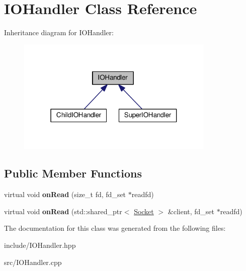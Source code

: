 \hypertarget{classIOHandler}{}\section{I\+O\+Handler Class Reference}
\label{classIOHandler}


Inheritance diagram for I\+O\+Handler\+:\nopagebreak
\begin{figure}[H]
\begin{center}
\leavevmode
\includegraphics[width=268pt]{classIOHandler__inherit__graph}
\end{center}
\end{figure}
\subsection*{Public Member Functions}
\begin{DoxyCompactItemize}
\item 
virtual void {\bfseries on\+Read} (size\+\_\+t fd, fd\+\_\+set $\ast$readfd)\hypertarget{classIOHandler_a623e46574ae279609c2f1f3020890c92}{}\label{classIOHandler_a623e46574ae279609c2f1f3020890c92}

\item 
virtual void {\bfseries on\+Read} (std\+::shared\+\_\+ptr$<$ \hyperlink{classSocket}{Socket} $>$ \&client, fd\+\_\+set $\ast$readfd)\hypertarget{classIOHandler_ac3d156d3c2051e6cc19256ad20111d52}{}\label{classIOHandler_ac3d156d3c2051e6cc19256ad20111d52}

\end{DoxyCompactItemize}


The documentation for this class was generated from the following files\+:\begin{DoxyCompactItemize}
\item 
include/I\+O\+Handler.\+hpp\item 
src/I\+O\+Handler.\+cpp\end{DoxyCompactItemize}
